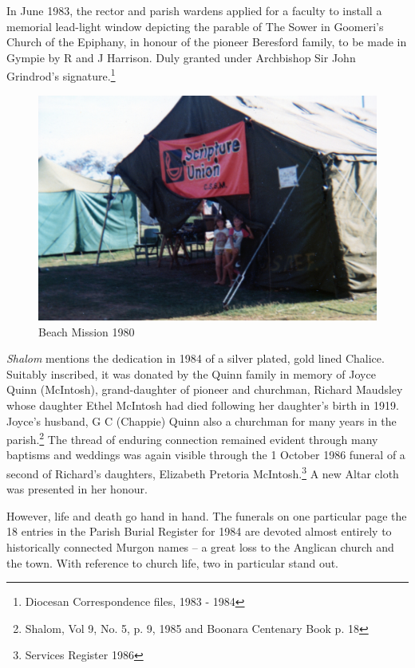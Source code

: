 In June 1983, the rector and parish wardens applied for a faculty to install a memorial lead-light window depicting the parable of The Sower in Goomeri's Church of the Epiphany, in honour of the pioneer Beresford family, to be made in Gympie by R and J Harrison. Duly granted under Archbishop Sir John Grindrod's signature.\footnote{Diocesan Correspondence files, 1983 - 1984}








\begin{figure}
\begin{center}
\includegraphics[width=1.\linewidth,center]{../images/beachMission1980.jpg}
\caption{Beach Mission 1980}
\end{center}
\end{figure}




\emph{Shalom} mentions the dedication in 1984 of a silver plated, gold lined Chalice. Suitably inscribed, it was donated by the Quinn family in memory of Joyce Quinn (McIntosh), grand-daughter of pioneer and churchman, Richard Maudsley whose daughter Ethel McIntosh had died following her daughter's birth in 1919. Joyce's husband, G C (Chappie) Quinn also a churchman for many years in the parish.\footnote{Shalom, Vol 9, No. 5, p. 9, 1985 and Boonara Centenary Book p. 18} The thread of enduring connection remained evident through many baptisms and weddings was again visible through the 1 October 1986 funeral of a second of Richard's daughters, Elizabeth Pretoria McIntosh.\footnote{Services Register 1986} A new Altar cloth was presented in her honour.


However, life and death go hand in hand. The funerals on one particular page the 18 entries in the Parish Burial Register for 1984 are devoted almost entirely to historically connected Murgon names -- a great loss to the Anglican church and the town. With reference to church life, two in particular stand out.



